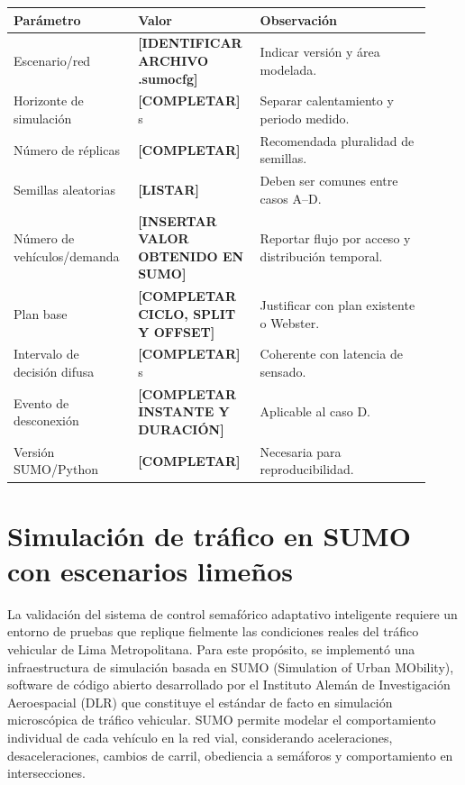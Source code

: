 \documentclass[12pt,a4paper,oneside]{report}
\begin{document}
\begin{longtable}{@{}p{0.28\linewidth}p{0.25\linewidth}p{0.39\linewidth}@{}}
\toprule
\textbf{Parámetro} & \textbf{Valor} & \textbf{Observación}\\
\midrule
\endhead
Escenario/red & \textbf{[IDENTIFICAR ARCHIVO .sumocfg]} & Indicar versión y área modelada.\\
Horizonte de simulación & \textbf{[COMPLETAR]} s & Separar calentamiento y periodo medido.\\
Número de réplicas & \textbf{[COMPLETAR]} & Recomendada pluralidad de semillas.\\
Semillas aleatorias & \textbf{[LISTAR]} & Deben ser comunes entre casos A--D.\\
Número de vehículos/demanda & \textbf{[INSERTAR VALOR OBTENIDO EN SUMO]} & Reportar flujo por acceso y distribución temporal.\\
Plan base & \textbf{[COMPLETAR CICLO, SPLIT Y OFFSET]} & Justificar con plan existente o Webster.\\
Intervalo de decisión difusa & \textbf{[COMPLETAR]} s & Coherente con latencia de sensado.\\
Evento de desconexión & \textbf{[COMPLETAR INSTANTE Y DURACIÓN]} & Aplicable al caso D.\\
Versión SUMO/Python & \textbf{[COMPLETAR]} & Necesaria para reproducibilidad.\\
\bottomrule
\end{longtable}

\section{Simulación de tráfico en SUMO con escenarios limeños}\label{simulaciuxf3n-de-truxe1fico-en-sumo-con-escenarios-limeuxf1os}

La validación del sistema de control semafórico adaptativo inteligente requiere un entorno de pruebas que replique fielmente las condiciones reales del tráfico vehicular de Lima Metropolitana. Para este propósito, se implementó una infraestructura de simulación basada en SUMO (Simulation of Urban MObility), software de código abierto desarrollado por el Instituto Alemán de Investigación Aeroespacial (DLR) que constituye el estándar de facto en simulación microscópica de tráfico vehicular. SUMO permite modelar el comportamiento individual de cada vehículo en la red vial, considerando aceleraciones, desaceleraciones, cambios de carril, obediencia a semáforos y comportamiento en intersecciones.
\end{document}
